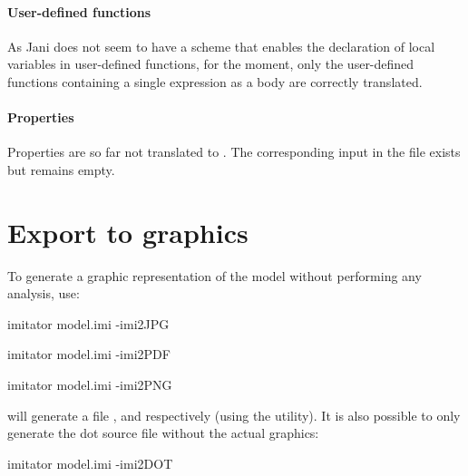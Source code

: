 \paragraph{User-defined functions}

As Jani does not seem to have a scheme that enables the declaration of local variables in user-defined functions, for the moment, only the user-defined functions containing a single expression as a body are correctly translated.

\paragraph{Properties}
Properties are so far not translated to \jani{}.
The corresponding input in the \jani{} file exists but remains empty.


\section{Export to graphics}\label{section:export:dot}

To generate a graphic representation of the \NIPTA{} model without performing any analysis, use:

\begin{terminal}
imitator model.imi -imi2JPG
\end{terminal}

\begin{terminal}
imitator model.imi -imi2PDF
\end{terminal}

\begin{terminal}
imitator model.imi -imi2PNG
\end{terminal}

\imitator{} will generate a file ,  and  respectively (using the \gdot{} utility).
It is also possible to only generate the dot source file without the actual graphics:

\begin{terminal}
imitator model.imi -imi2DOT
\end{terminal}

